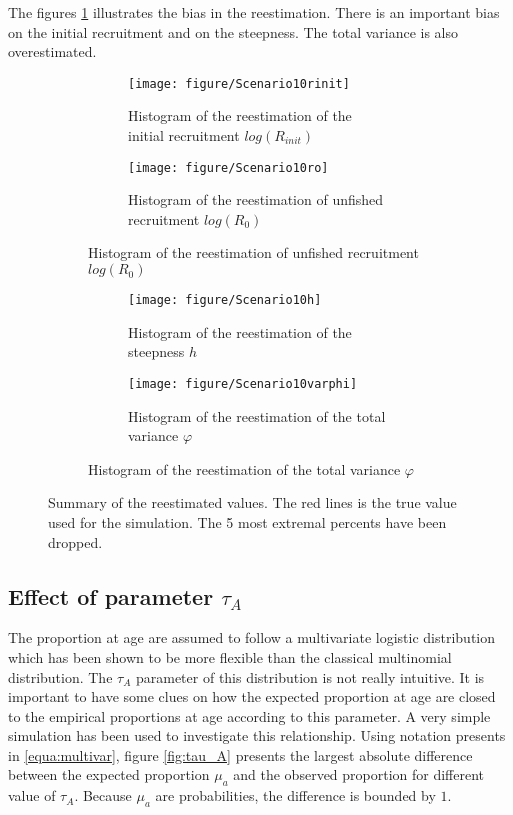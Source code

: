 The figures \ref{fig:sim} illustrates the bias in the reestimation. There is an important bias on the initial recruitment and on the steepness.
The total variance is also overestimated.


\begin{figure}
  \begin{subfigure}[b]{\textwidth}
	\begin{subfigure}[b]{0.45\textwidth}
	\texttt{[image: figure/Scenario10rinit]}
	\caption{ Histogram of the reestimation of the initial recruitment $log(R_{init})$ }
	\end{subfigure}\hfill
	\begin{subfigure}[b]{0.45\textwidth}
	\texttt{[image: figure/Scenario10ro]}
	\caption{ Histogram of the reestimation of unfished recruitment $log(R_0)$}
	\end{subfigure}
  \end{subfigure}
  \begin{subfigure}[b]{\textwidth}
\begin{subfigure}[b]{0.45\textwidth}
  \texttt{[image: figure/Scenario10h]}
  \caption{ Histogram of the reestimation of the steepness $h$ }
 \end{subfigure}\hfill
 \begin{subfigure}[b]{0.45\textwidth}
  \texttt{[image: figure/Scenario10varphi]}
  \caption{ Histogram of the reestimation of the total variance $\varphi$}
 \end{subfigure}
  \end{subfigure}
 \caption{Summary of the reestimated values. The red lines is the true value used for the simulation. The 5 most extremal percents have been dropped.}
\label{fig:sim}
\end{figure} 



\subsection{Effect of parameter $\tau_A$}
The proportion at age are assumed to follow a multivariate logistic distribution which has been shown \cite{Schnute+95} to be more flexible than the classical multinomial distribution. The $\tau_A$ parameter of this distribution is not really  intuitive. It is important to have some clues on how the expected proportion at age are closed to the empirical proportions at age according to this parameter. A very simple simulation has been used to investigate this relationship. Using notation presents in \ref{equa:multivar}, figure \ref{fig:tau_A} presents the largest absolute difference between the expected proportion $\mu_a$ and the observed proportion for different value of $\tau_A$. Because $\mu_a$ are probabilities, the difference is bounded by $1$. 

